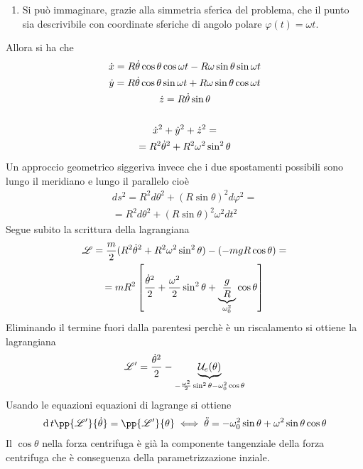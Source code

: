 \documentclass[Main.tex]{subfiles}
\begin{document}
\begin{tema}
\begin{enumerate}
		\item Si può immaginare, grazie alla simmetria sferica del problema, che il punto sia descrivibile con coordinate sferiche di angolo polare $\varphi(t)=\omega t$.
	\end{enumerate}
	Allora si ha che 
	\begin{gather}
		\dot x = R \dot \theta \cos \theta \cos \omega t - R \omega \sin \theta \sin \omega t \\
		\dot y = R \dot \theta \cos \theta \sin \omega t + R \omega \sin \theta \cos \omega t \\
		\dot z = R \dot \theta \sin \theta \\
		\ \notag \\
		\dot x^2 + \dot y^2 + \dot z^2 =\\
		=R^2 \dot \theta^2 + R^2 \omega^2 \sin^2 \theta 
	\end{gather}
	Un approccio geometrico siggeriva invece che i due spostamenti possibili sono lungo il meridiano e lungo il parallelo cioè 
	\begin{gather}
		ds^2= R^2 d \theta^2 + (R \sin \theta )^2 d \varphi^2 = \\
		=R^2 d \theta^2 + (R \sin \theta)^2 \omega ^2 dt^2 
	\end{gather}
	Segue subito la scrittura della lagrangiana
	\begin{gather}
		\mathscr{L}= \frac{m}{2} ( R^2 \dot \theta^2 + R^2 \omega ^2 \sin^2 \theta ) - (-mg R \cos \theta)=\\
		=mR^2\left[ \frac{\dot \theta^2}{2} + \frac{\omega^2}{2} \sin ^2 \theta + \underbrace{\frac{g}{R}}_{\omega_0^2} \cos \theta  \right]
	\end{gather}
	Eliminando il termine fuori dalla parentesi perchè è un riscalamento si ottiene la lagrangiana
	\begin{gather}
		\mathscr{L}' = \frac{\dot \theta^2}{2} - \underbrace{\mathcal{U} _e( \theta)}_{-\frac{\omega^2}{2} \sin ^2 \theta - \omega_0^2 \cos \theta}
	\end{gather}
	Usando le equazioni equazioni di lagrange si ottiene
	\begin{gather}
		\dd{}{t} \pp{\L'}{\dot \theta } = \pp{\L'}{\theta} \iff \ddot \theta = - \omega_0^2 \sin \theta + \omega ^2 \sin \theta \cos \theta 
	\end{gather}
	Il $\cos \theta$ nella forza centrifuga è già la componente tangenziale della forza centrifuga che è conseguenza della parametrizzazione inziale.
	

\end{tema}
\end{document}
